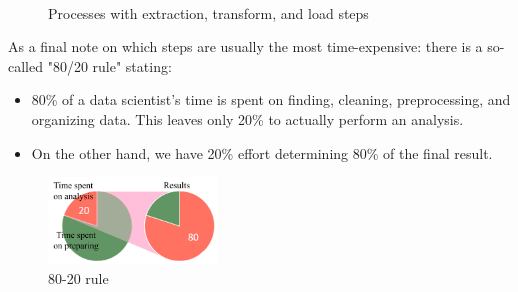 \begin{figure}[H]
  \centering

  \\\vspace*{0.5cm}

  \caption{Processes with extraction, transform, and load steps}
  \label{fig:1_etl_and_elt}
\end{figure}

As a final note on which steps are usually the most time-expensive: there is a so-called "80/20 rule" stating:
\begin{itemize}
  \item 80\% of a data scientist's time is spent on finding, cleaning, preprocessing, and organizing data. This leaves only 20\% to actually perform an analysis.
  \item On the other hand, we have 20\% effort determining 80\% of the final result.
\end{itemize}

\begin{figure}[H]
  \centering
  \includegraphics[width=0.4\textwidth]{assets/basics/80_20.png}
  \caption{80-20 rule}
  \label{fig:1_80_20}
\end{figure}